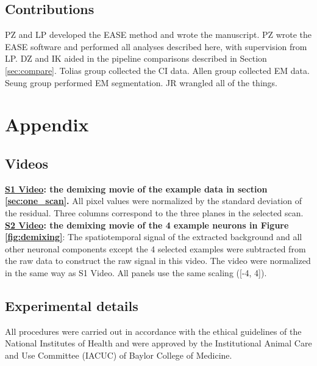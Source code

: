 \documentclass[10pt,letterpaper]{article}
\def \videoOneURL{https://www.dropbox.com/s/0ph27nsx5fxcc1b/demixing_scan_1_201_9100.avi?dl=0}
\def \videoTwoURL{https://www.dropbox.com/s/jmkedq2f3nniy0a/demixing_example.avi?dl=0}
\begin{document}
{\subsection*{Contributions}

PZ and LP developed the EASE method and wrote the manuscript. PZ wrote the EASE software and performed all analyses described here, with supervision from LP.  DZ and IK aided in the pipeline comparisons described in Section \ref{sec:compare}.  Tolias group collected the CI data.  Allen group collected EM data.  Seung group performed EM segmentation.  JR wrangled all of the things.  

\clearpage

\section{Appendix}

\subsection{Videos}

\noindent \href{\videoOneURL}{\bf S1 Video}{\bf: the demixing movie of the example data in section \ref{sec:one_scan}.} All pixel values were normalized by the standard deviation of the residual. Three columns correspond to the three planes in the selected scan.   \\

\noindent\href{\videoTwoURL}{\bf S2 Video}{\bf: the demixing movie of the 4 example neurons in Figure \ref{fig:demixing}}: The spatiotemporal signal of the extracted background and all other neuronal components except the 4 selected examples were subtracted from the raw data to construct the raw signal in this video. The video were normalized in the same way as S1 Video.  All panels use the same scaling ([-4, 4]). 


\subsection{Experimental details}
All procedures were carried out in accordance with the ethical guidelines of the National Institutes of Health and were approved by the Institutional Animal Care and Use Committee (IACUC) of Baylor College of Medicine.


}
\end{document}
